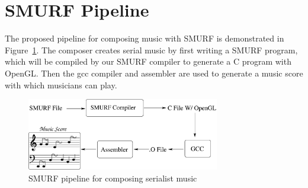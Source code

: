 \section{SMURF Pipeline}

The proposed pipeline for composing music with SMURF is demonstrated in Figure~\ref{fig:pipeline}. 
The composer creates serial music by first writing a SMURF program, which will be 
compiled by our SMURF compiler to generate a C program with OpenGL. Then the gcc compiler 
and assembler are used to generate a music score with which musicians can play. 


\begin{figure}
	\centering
	\includegraphics[width=0.75\textwidth]{figures/pipeline}
	\caption{SMURF pipeline for composing serialist music}
	\label{fig:pipeline}
\end{figure}
